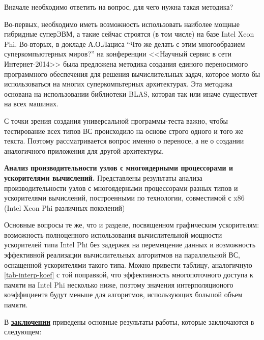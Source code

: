 Вначале необходимо ответить на вопрос, для чего нужна такая методика?

Во-первых, необходимо иметь возможность использовать наиболее мощные гибридные суперЭВМ, а такие сейчас строятся (в том числе) на базе Intel Xeon Phi. Во-вторых, в
докладе А.О.Лациса “Что же делать с этим многообразием суперкомпьютерных миров?” на конференции <<Научный сервис в сети Интернет-2014>> \cite{Lacis2014} была предложена методика создания единого переносимого программного обеспечения для решения вычислительных задач, которое могло бы использоваться на многих суперкомпьтерных архитектурах. Эта методика основана на использовании библиотеки BLAS, которая так или иначе существует на всех машинах.


С точки зрения создания универсальной программы-теста важно, чтобы тестирование всех типов ВС происходило на основе строго одного и того же текста. Поэтому рассматривается вопрос именно о переносе, а не о создании аналогичного приложения для другой архитектуры. 


\textbf{Анализ производительности узлов с многоядерными процессорами и ускорителями вычислений.} 
Представлены результаты анализа производительности узлов с многоядерными процессорами разных типов и ускорителями вычислений, построенными по технологии, совместимой с x86 (Intel Xeon Phi различных поколений)

Основные вопросы те же, что и разделе, посвященном графическим ускорителям: возможность полноценного использования вычислительной мощности 
ускорителей типа Intel Phi без задержек на перемещение данных и возможность эффективной реализации вычислительных алгоритмов на параллельной ВС, оснащенной ускорителями такого типа. Можно привести таблицу, аналогичную \ref{tab-interp-koef} с той поправкой, что эффективность многопоточного доступа к памяти на Intel Phi несколько ниже, поэтому значения интерполяционого коэффициента будут меньше для алгоритмов, использующих большой объем памяти.


В \underline{\textbf{заключении}} приведены основные результаты работы, которые заключаются в следующем:



